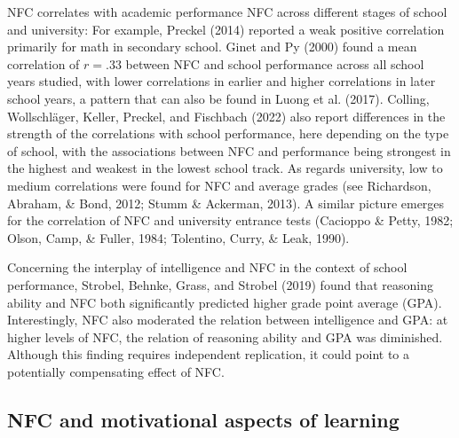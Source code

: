 \documentclass[
  man]{apa6}
\begin{document}
NFC correlates with academic performance NFC across different stages of school and university: For example, Preckel (2014) reported a weak positive correlation primarily for math in secondary school. Ginet and Py (2000) found a mean correlation of \(r=.33\) between NFC and school performance across all school years studied, with lower correlations in earlier and higher correlations in later school years, a pattern that can also be found in Luong et al. (2017). Colling, Wollschläger, Keller, Preckel, and Fischbach (2022) also report differences in the strength of the correlations with school performance, here depending on the type of school, with the associations between NFC and performance being strongest in the highest and weakest in the lowest school track. As regards university, low to medium correlations were found for NFC and average grades (see Richardson, Abraham, \& Bond, 2012; Stumm \& Ackerman, 2013). A similar picture emerges for the correlation of NFC and university entrance tests (Cacioppo \& Petty, 1982; Olson, Camp, \& Fuller, 1984; Tolentino, Curry, \& Leak, 1990).

Concerning the interplay of intelligence and NFC in the context of school performance, Strobel, Behnke, Grass, and Strobel (2019) found that reasoning ability and NFC both significantly predicted higher grade point average (GPA). Interestingly, NFC also moderated the relation between intelligence and GPA: at higher levels of NFC, the relation of reasoning ability and GPA was diminished. Although this finding requires independent replication, it could point to a potentially compensating effect of NFC.

\hypertarget{nfc-and-motivational-aspects-of-learning}{%
\subsection{NFC and motivational aspects of learning}\label{nfc-and-motivational-aspects-of-learning}}
\end{document}
